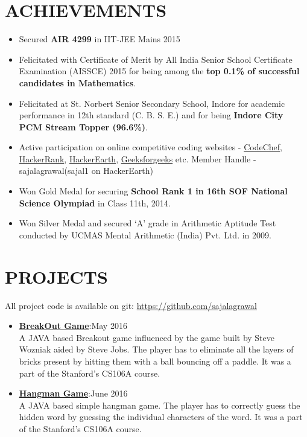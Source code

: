 \documentclass[line, margin]{res}
\begin{document}
\begin{resume}
\section{ACHIEVEMENTS}
\begin{itemize}
\item Secured \textbf{AIR 4299} in IIT-JEE Mains 2015
\item Felicitated with Certificate of Merit by All India Senior School Certificate Examination (AISSCE) 2015 for being among the \textbf{top 0.1\% of successful candidates in Mathematics}.
\item Felicitated at St. Norbert Senior Secondary School, Indore for academic performance in 12th standard (C. B. S. E.) and for being \textbf{Indore City PCM Stream Topper (96.6\%)}.
\item Active participation on online competitive coding websites - \href{https://www.codechef.com/users/sajalagrawal}{CodeChef}, \href{https://www.hackerrank.com/sajalagrawal}{HackerRank}, \href{https://www.hackerearth.com/@sajal1}{HackerEarth}, \href{http://www.practice.geeksforgeeks.org/user-profile.php?user=sajalagrawal}{Geeksforgeeks} etc.
Member Handle - sajalagrawal(sajal1 on HackerEarth)
\item Won Gold Medal for securing \textbf{School Rank 1 in 16th SOF National Science Olympiad} in Class 11th, 2014.
\item Won Silver Medal and secured ‘A’ grade in Arithmetic Aptitude Test conducted by UCMAS Mental Arithmetic (India) Pvt. Ltd. in 2009.
\end{itemize}

\section{PROJECTS}
All project code is available on git: \href{https://github.com/sajalagrawal}{https://github.com/sajalagrawal}
\begin{itemize}
\item\textbf{\href{https://github.com/sajalagrawal/Breakout-Game}{BreakOut Game}}:\hfill May 2016\\ A JAVA based Breakout game influenced by the game built by Steve Wozniak aided by Steve Jobs. The player has to eliminate all the layers of bricks present by hitting them with a ball bouncing off a paddle. It was a part of the Stanford's CS106A course.
\item\textbf{\href{https://github.com/sajalagrawal/Hangman-Game}{Hangman Game}}:\hfill June 2016\\ A JAVA based simple hangman game. The player has to correctly guess the hidden word by guessing the individual characters of the word. It was a part of the Stanford's CS106A course.
\end{itemize}


\end{resume}
\end{document}

